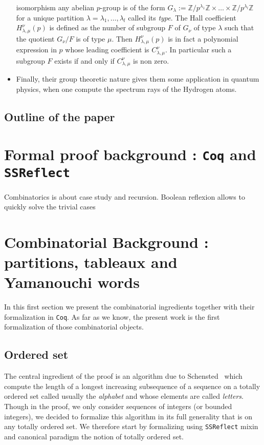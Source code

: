 \documentclass[12pt,a4paper]{article}
\newcommand{\Coq}{\texttt{Coq}\xspace}
\newcommand{\SSR}{\texttt{SSReflect}\xspace}
\newcommand{\Z}{{\mathbb Z}}
\begin{document}
\begin{itemize}
    isomorphism any abelian $p$-group is of the form
    $G_\lambda:=\Z/p^{\lambda_1}\Z\times\dots\times\Z/p^{\lambda_{l}}\Z$ for a
    unique partition $\lambda=\lambda_1,\dots,\lambda_{l}$ called its
    \emph{type}. The Hall coefficient $H_{\lambda,\mu}^{\nu}(p)$ is defined as
    the number of subgroup $F$ of $G_\nu$ of type $\lambda$ such that the
    quotient $G_\nu/F$ is of type $\mu$. Then $H_{\lambda,\mu}^{\nu}(p)$ is in
    fact a polynomial expression in $p$ whose leading coefficient is
    $C_{\lambda,\mu}^{\nu}$. In particular such a subgroup $F$ exists if and
    only if $C_{\lambda,\mu}^{\nu}$ is non zero.
\item Finally, their group theoretic nature gives them some application in
  quantum physics, when one compute the spectrum rays of the Hydrogen atoms.
\end{itemize}

\subsection{Outline of the paper}


\section{Formal proof background : \Coq and \SSR}

\todo[inline]{A small intro to \SSR}

Combinatorics is about case study and recursion.
Boolean reflexion allows to quickly solve the trivial cases

\section{Combinatorial Background : partitions, tableaux and Yamanouchi words}

In this first section we present the combinatorial ingredients together with
their formalization in \Coq. As far as we know, the present work is the first
formalization of those combinatorial objects.


\subsection{Ordered set}

The central ingredient of the proof is an algorithm due to
Schensted~\cite{schensted} which compute the length of a longest increasing
subsequence of a sequence on a totally ordered set called usually the
\emph{alphabet} and whose elements are called \emph{letters}. Though in the
proof, we only consider sequences of integers (or bounded integers), we decided
to formalize this algorithm in its full generality that is on any totally
ordered set. We therefore start by formalizing using \SSR mixin and canonical
paradigm the notion of totally ordered set.
\end{document}
